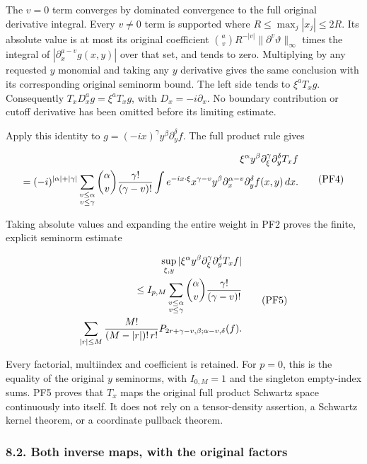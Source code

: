 \documentclass[
  11pt,
]{article}
\begin{document}
The \(v=0\) term converges by dominated convergence to the full original
derivative integral. Every \(v\ne0\) term is supported where
\(R\leq\max_j|x_j|\leq2R\). Its absolute value is at most its original
coefficient \({a\choose v}R^{-|v|}\|\partial^v\vartheta\|_\infty\) times
the integral of \(|\partial_x^{a-v}g(x,y)|\) over that set, and tends to
zero. Multiplying by any requested \(y\) monomial and taking any \(y\)
derivative gives the same conclusion with its corresponding original
seminorm bound. The left side tends to \(\xi^aT_xg\). Consequently
\(T_xD_x^ag=\xi^aT_xg\), with \(D_x=-i\partial_x\). No boundary
contribution or cutoff derivative has been omitted before its limiting
estimate.

Apply this identity to \(g=(-ix)^\gamma y^\beta\partial_y^\delta f\).
The full product rule gives

\[
\begin{aligned}
 \xi^\alpha y^\beta\partial_\xi^\gamma\partial_y^\delta T_xf
 \\
 =(-i)^{|\alpha|+|\gamma|}
   \sum_{\substack{v\leq\alpha\\v\leq\gamma}}
       {\alpha\choose v}{\gamma!\over(\gamma-v)!}
       \int e^{-ix\cdot\xi}x^{\gamma-v}y^\beta
                \partial_x^{\alpha-v}\partial_y^\delta f(x,y)\,dx.
 \end{aligned}
\tag{PF4}
\]

Taking absolute values and expanding the entire weight in PF2 proves the
finite, explicit seminorm estimate

\[
\begin{aligned}
 \sup_{\xi,y}
  |\xi^\alpha y^\beta\partial_\xi^\gamma\partial_y^\delta T_xf|
 \\
 \leq I_{p,M}
   \sum_{\substack{v\leq\alpha\\v\leq\gamma}}
       {\alpha\choose v}{\gamma!\over(\gamma-v)!}
 \\
   \sum_{|r|\leq M}{M!\over(M-|r|)!\,r!}
       P_{2r+\gamma-v,\beta;\alpha-v,\delta}(f).
 \end{aligned}
\tag{PF5}
\]

Every factorial, multiindex and coefficient is retained. For \(p=0\),
this is the equality of the original \(y\) seminorms, with \(I_{0,M}=1\)
and the singleton empty-index sums. PF5 proves that \(T_x\) maps the
original full product Schwartz space continuously into itself. It does
not rely on a tensor-density assertion, a Schwartz kernel theorem, or a
coordinate pullback theorem.

\subsubsection{8.2. Both inverse maps, with the original
factors}\label{both-inverse-maps-with-the-original-factors}
\end{document}
